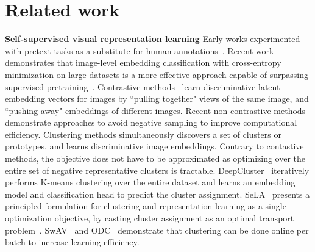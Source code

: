 \documentclass{bmvc2k}
\begin{document}
\section{Related work}
\label{sec:related_work}

\textbf{Self-supervised visual representation learning} Early works experimented with pretext tasks as a substitute for human annotations~\cite{Doersch2015PatchPred,Pathak2016Inpainting, Noroozi2016Jigsaw,Bucci2021SSLAcrossDomains,Gidaris2018RotPred,Zhang2016ColorfulIC}. Recent work demonstrates that image-level embedding classification with cross-entropy minimization on large datasets is a more effective approach capable of surpassing supervised pretraining~\cite{Goyal2021SEER, Caron2021DINO}. Contrastive methods~\cite{Chopra2005TripletLoss, Chen2020SimCLR, Oord2018ContrastivePredCoding, He2020MoCo} learn discriminative latent embedding vectors for images by ``pulling together" views of the same image, and ``pushing away" embeddings of different images. Recent non-contrastive methods~\cite{Zbontar2021BarlowTwins, Grill2020BYOL, Caron2021DINO} demonstrate approaches to avoid negative sampling to improve computational efficiency. Clustering methods \cite{Caron2018DeepCluster, Asano2020SeLA,Caron2020SwAV, Caron2019Noncurrated, Zhan2020OnlineDC, Yang2019DeepClusterGMVA, Li2021ContClust} simultaneously discovers a set of clusters or prototypes, and learns discriminative image embeddings. Contrary to contastive methods, the objective does not have to be approximated as optimizing over the entire set of negative representative clusters is tractable. DeepCluster~\cite{Caron2018DeepCluster} iteratively performs K-means clustering over the entire dataset and learns an embedding model and classification head to predict the cluster assignment. SeLA~\cite{Asano2020SeLA} presents a principled formulation for clustering and representation learning as a single optimization objective, by casting cluster assignment as an optimal transport problem~\cite{Levy2018OptimalTransport, Cuturi2013OptimalTransport}. SwAV~\cite{Caron2020SwAV} and ODC~\cite{Zhan2020OnlineDC} demonstrate that clustering can be done online per batch to increase learning efficiency.
\end{document}
